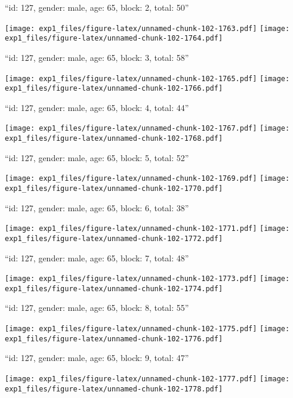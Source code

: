 \documentclass[11pt,,]{article}
\begin{document}
\newpage
[1] 

``id: 127, gender: male, age: 65, block: 2, total: 50''

\texttt{[image: exp1\_files/figure-latex/unnamed-chunk-102-1763.pdf]}
\texttt{[image: exp1\_files/figure-latex/unnamed-chunk-102-1764.pdf]}

\newpage
[1] 

``id: 127, gender: male, age: 65, block: 3, total: 58''

\texttt{[image: exp1\_files/figure-latex/unnamed-chunk-102-1765.pdf]}
\texttt{[image: exp1\_files/figure-latex/unnamed-chunk-102-1766.pdf]}

\newpage
[1] 

``id: 127, gender: male, age: 65, block: 4, total: 44''

\texttt{[image: exp1\_files/figure-latex/unnamed-chunk-102-1767.pdf]}
\texttt{[image: exp1\_files/figure-latex/unnamed-chunk-102-1768.pdf]}

\newpage
[1] 

``id: 127, gender: male, age: 65, block: 5, total: 52''

\texttt{[image: exp1\_files/figure-latex/unnamed-chunk-102-1769.pdf]}
\texttt{[image: exp1\_files/figure-latex/unnamed-chunk-102-1770.pdf]}

\newpage
[1] 

``id: 127, gender: male, age: 65, block: 6, total: 38''

\texttt{[image: exp1\_files/figure-latex/unnamed-chunk-102-1771.pdf]}
\texttt{[image: exp1\_files/figure-latex/unnamed-chunk-102-1772.pdf]}

\newpage
[1] 

``id: 127, gender: male, age: 65, block: 7, total: 48''

\texttt{[image: exp1\_files/figure-latex/unnamed-chunk-102-1773.pdf]}
\texttt{[image: exp1\_files/figure-latex/unnamed-chunk-102-1774.pdf]}

\newpage
[1] 

``id: 127, gender: male, age: 65, block: 8, total: 55''

\texttt{[image: exp1\_files/figure-latex/unnamed-chunk-102-1775.pdf]}
\texttt{[image: exp1\_files/figure-latex/unnamed-chunk-102-1776.pdf]}

\newpage
[1] 

``id: 127, gender: male, age: 65, block: 9, total: 47''

\texttt{[image: exp1\_files/figure-latex/unnamed-chunk-102-1777.pdf]}
\texttt{[image: exp1\_files/figure-latex/unnamed-chunk-102-1778.pdf]}
\end{document}
